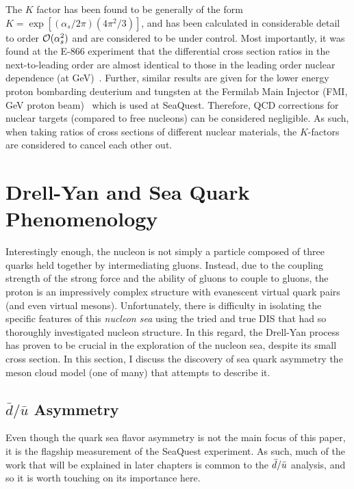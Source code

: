 The $K$ factor has been found to be generally of the form $K = \exp[(\alpha_s/2\pi)(4\pi^2/3)]$, and has been calculated in considerable detail~\cite{Matsuura:1988sm} to order $\mathcal{O}(\alpha_s^2)$ and are considered to be under control. Most importantly, it was found at the E-866 experiment that the differential cross section ratios in the next-to-leading order are almost identical to those in the leading order nuclear dependence (at \unit[800]{GeV})~\cite{Duan:2004cw}. Further, similar results are given for the lower energy proton bombarding deuterium and tungsten at the Fermilab Main Injector (FMI, \unit[120]{GeV} proton beam)~\cite{Geesaman:906prop} which is used at SeaQuest. Therefore, QCD corrections for nuclear targets (compared to free nucleons) can be considered negligible. As such, when taking ratios of cross sections of different nuclear materials, the $K$-factors are considered to cancel each other out.

\section{Drell-Yan and Sea Quark Phenomenology}

Interestingly enough, the nucleon is not simply a particle composed of three quarks held together by intermediating gluons. Instead, due to the coupling strength of the strong force and the ability of gluons to couple to gluons, the proton is an impressively complex structure with evanescent virtual quark pairs (and even virtual mesons). Unfortunately, there is difficulty in isolating the specific features of this \emph{nucleon sea} using the tried and true DIS that had so thoroughly investigated nucleon structure. In this regard, the Drell-Yan process has proven to be crucial in the exploration of the nucleon sea, despite its small cross section. In this section, I discuss the discovery of sea quark asymmetry the meson cloud model (one of many) that attempts to describe it.

\subsection{$\bar{d}/\bar{u}$ Asymmetry}

Even though the quark sea flavor asymmetry is not the main focus of this paper, it is the flagship measurement of the SeaQuest experiment. As such, much of the work that will be explained in later chapters is common to the $\bar{d}/\bar{u}$ analysis, and so it is worth touching on its importance here.

